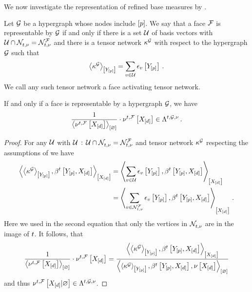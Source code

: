 We now investigate the representation of refined base measures by \ComputationActivationNetworks{}.

\begin{definition}
    \label{def:faceRepresentability}
    Let $\mathcal{G}$ be a hypergraph whose nodes include $[p]$.
    We say that a face $\mathcal{F}$ is representable by $\mathcal{G}$ if and only if there is a set $\mathcal{U}$ of basis vectors with $\mathcal{U}\cap\mathcal{N}_{t,\nu}^{} = \mathcal{N}_{t,\nu}^{\mathcal{F}}$ and there is a tensor network $\kappa^{\mathcal{G}}$ with respect to the hypergraph $\mathcal{G}$ such that
    \begin{align*}
        \contractionof{\kcoreof{\graph}}{\headvariables}
        = \sum_{\imelement\in\arbset} \onehotmapofat{\imelement}{\headvariables} \, . %
    \end{align*}
    We call any such tensor network a face activating tensor network.
\end{definition}

\begin{lemma}
    \label{lem:faceMeasureRepresentation}
    If and only if a face is representable by a hypergraph $\mathcal{G}$, we have
    \begin{align*}
        \frac{1}{\left\langle \nu^{t,\mathcal{F}}\left[X_{[d]}\right]\right\rangle_{\left[ \varnothing \right]}} \cdot \nu^{t,\mathcal{F}}\left[X_{[d]}\right]
        \in \Lambda^{t,\mathcal{G},\nu} \, .
    \end{align*}
\end{lemma}
\begin{proof}
    For any $\mathcal{U}$ with $\mathcal{U} \,:\, \mathcal{U}\cap\mathcal{N}_{t,\nu}^{} = \mathcal{N}_{t,\nu}^{\mathcal{F}}$ and tensor network $\kappa^{\mathcal{G}}$ respecting the assumptions of  we have
    \begin{align*}
        \left\langle \left\langle \kappa^{\mathcal{G}}\right\rangle_{\left[ Y_{[p]} \right]},\beta^{t}\left[Y_{[p]},X_{[d]}\right]\right\rangle_{\left[ X_{[d]} \right]}
        &= \left\langle \sum_{v\in\mathcal{U}}\epsilon_{v}\left[Y_{[p]}\right],\beta^{t}\left[Y_{[p]},X_{[d]}\right]\right\rangle_{\left[ X_{[d]} \right]} \\
        &= \left\langle \sum_{v\in\mathcal{N}_{t,\nu}^{\mathcal{F}}}\epsilon_{v}\left[Y_{[p]}\right],\beta^{t}\left[Y_{[p]},X_{[d]}\right]\right\rangle_{\left[ X_{[d]} \right]} \, .
    \end{align*}
    Here we used in the second equation that only the vertices in $\mathcal{N}_{t,\nu}^{} $ are in the image of $t$.
    It follows, that
    \begin{align*}
        \frac{1}{\left\langle \nu^{t,\mathcal{F}}\left[X_{[d]}\right]\right\rangle_{\left[ \varnothing \right]}} \cdot \nu^{t,\mathcal{F}}\left[X_{[d]}\right]
        = \frac{
            \left\langle \left\langle \kappa^{\mathcal{G}}\right\rangle_{\left[ Y_{[p]} \right]},\beta^{t}\left[Y_{[p]},X_{[d]}\right]\right\rangle_{\left[ X_{[d]} \right]}
        }{
            \left\langle \left\langle \kappa^{\mathcal{G}}\right\rangle_{\left[ Y_{[p]} \right]},\beta^{t}\left[Y_{[p]},X_{[d]}\right],\nu\left[X_{[d]}\right]\right\rangle_{\left[ \varnothing \right]}
        }
    \end{align*}
    and thus $\nu^{t,\mathcal{F}}\left[X_{[d]}|\varnothing\right] \in \Lambda^{t,\mathcal{G},\nu}$.
\end{proof}

